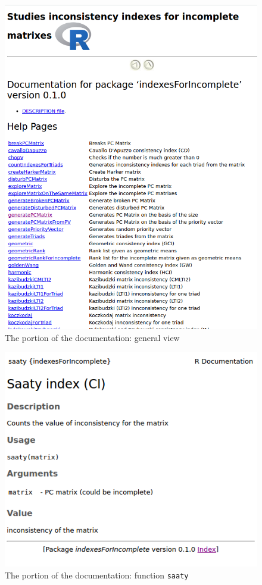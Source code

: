 \begin{figure}[h]
\centerline{\includegraphics[scale=0.58]{images/kod31.png}}
\caption{The portion of the documentation: general view}
\end{figure}

\begin{figure}[h]
\centerline{\includegraphics[scale=2.4]{images/kod32.png}}
\caption{The portion of the documentation: function \texttt{saaty}}
\end{figure}

